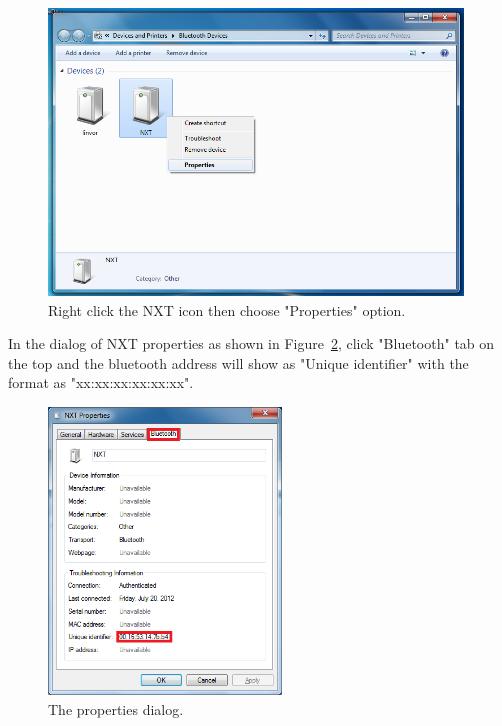\documentclass[11pt]{article}
\begin{document}
\begin{figure}[H]
  \begin{center}
    \includegraphics[height=3in]{figure/configuration/getBTaddress/btProperties.png}
    \caption{Right click the NXT icon then choose "Properties" option.\label{fig:bt_property}}
  \end{center}
\end{figure}

In the dialog of NXT properties as shown in Figure~\ref{fig:bt_property_dialog}, click "Bluetooth" tab on the
top and the bluetooth address will show as "Unique identifier" with the format as "xx:xx:xx:xx:xx:xx".

\begin{figure}[H]
  \begin{center}
    \includegraphics[height=3in]{figure/configuration/getBTaddress/btPropertiesDlg.png}
    \caption{The properties dialog.\label{fig:bt_property_dialog}}
  \end{center}
\end{figure}
\end{document}
